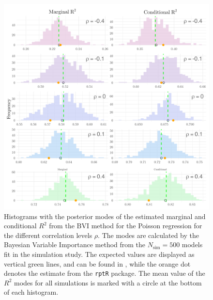 \begin{figure}[H]
  \centering
  \includegraphics[width=1\linewidth]{Figures/Simulation study/R2_combined_poisson.png}
  \caption[Marginal and conditional $R^2$ in Poisson GLMM]{Histograms with the posterior modes of the estimated marginal and conditional $R^2$ from the BVI method for the Poisson regression for the different correlation levels $\rho$. The modes are calculated by the Bayesian Variable Importance method from the $N_{\text{sim}}=500$ models fit in the simulation study. The expected values are displayed as vertical green lines, and can be found in , while the orange dot denotes the estimate from the \texttt{rptR} package. The mean value of the $R^2$ modes for all simulations is marked with a circle at the bottom of each histogram.}
  \label{fig:r2_combined_poisson}
\end{figure}
